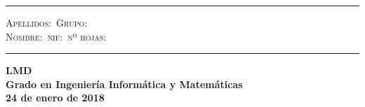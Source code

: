 \documentclass[10pt,spanish]{article}
\begin{document}

\begin{flushleft}
\hrule\vspace{4mm}
\textsc{Apellidos:}\makebox[115mm]\dotfill\ \textsc{Grupo:}\dotfill\\[4mm]
\textsc{Nombre:}\makebox[70mm]\dotfill\
\textsc{nif:}\makebox[40mm]\dotfill\ \textsc{nº hojas:}\dotfill\\[5mm]
\hrule
\end{flushleft}

\begin{center}
  \textbf{\huge LMD}\\[2mm]
  \textbf{\Large Grado en Ingeniería Informática y Matemáticas}\\[2mm]
  \textbf{\large 24 de enero de 2018}
\end{center}
\end{document}
